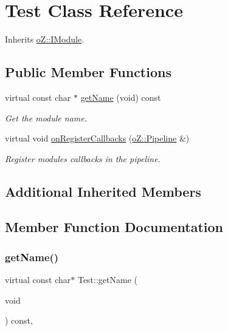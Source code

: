 \hypertarget{class_test}{}\section{Test Class Reference}
\label{class_test}


Inherits \mbox{\hyperlink{classo_z_1_1_i_module}{o\+Z\+::\+I\+Module}}.

\subsection*{Public Member Functions}
\begin{DoxyCompactItemize}
\item 
virtual const char $\ast$ \mbox{\hyperlink{class_test_a2e412f7d1c6a56e19891f985da9d860c}{get\+Name}} (void) const
\begin{DoxyCompactList}\small\item\em Get the module name. \end{DoxyCompactList}\item 
virtual void \mbox{\hyperlink{class_test_a7f2db863bfcc353124a75aa2b72af1bf}{on\+Register\+Callbacks}} (\mbox{\hyperlink{classo_z_1_1_pipeline}{o\+Z\+::\+Pipeline}} \&)
\begin{DoxyCompactList}\small\item\em Register module\textquotesingle{}s callbacks in the pipeline. \end{DoxyCompactList}\end{DoxyCompactItemize}
\subsection*{Additional Inherited Members}


\subsection{Member Function Documentation}
\mbox{\label{class_test_a2e412f7d1c6a56e19891f985da9d860c}} 
\subsubsection{\texorpdfstring{getName()}{getName()}}
{\footnotesize\ttfamily virtual const char$\ast$ Test\+::get\+Name (\begin{DoxyParamCaption}\item[{void}]{ }\end{DoxyParamCaption}) const\hspace{0.3cm}{\ttfamily [inline]}, {\ttfamily [virtual]}}



